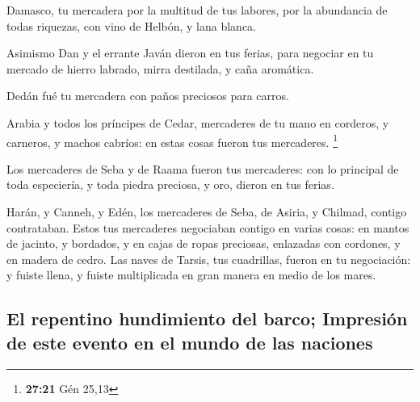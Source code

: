  Damasco, tu mercadera por la multitud de tus labores,
por la abundancia de todas riquezas, con vino de Helbón, y lana blanca.

 Asimismo Dan y el errante Javán dieron en tus ferias,
para negociar en tu mercado de hierro labrado, mirra destilada, y caña
aromática.

 Dedán fué tu mercadera con paños preciosos para carros.

 Arabia y todos los príncipes de Cedar, mercaderes de tu
mano en corderos, y carneros, y machos cabríos: en estas cosas fueron
tus mercaderes. \footnote{\textbf{27:21} Gén 25,13}

 Los mercaderes de Seba y de Raama fueron tus mercaderes:
con lo principal de toda especiería, y toda piedra preciosa, y oro,
dieron en tus ferias.

 Harán, y Canneh, y Edén, los mercaderes de Seba, de
Asiria, y Chilmad, contigo contrataban.  Estos tus
mercaderes negociaban contigo en varias cosas: en mantos de jacinto, y
bordados, y en cajas de ropas preciosas, enlazadas con cordones, y en
madera de cedro.  Las naves de Tarsis, tus cuadrillas,
fueron en tu negociación: y fuiste llena, y fuiste multiplicada en gran
manera en medio de los mares.

\hypertarget{el-repentino-hundimiento-del-barco-impresiuxf3n-de-este-evento-en-el-mundo-de-las-naciones}{%
\subsection{El repentino hundimiento del barco; Impresión de este evento
en el mundo de las
naciones}\label{el-repentino-hundimiento-del-barco-impresiuxf3n-de-este-evento-en-el-mundo-de-las-naciones}}

